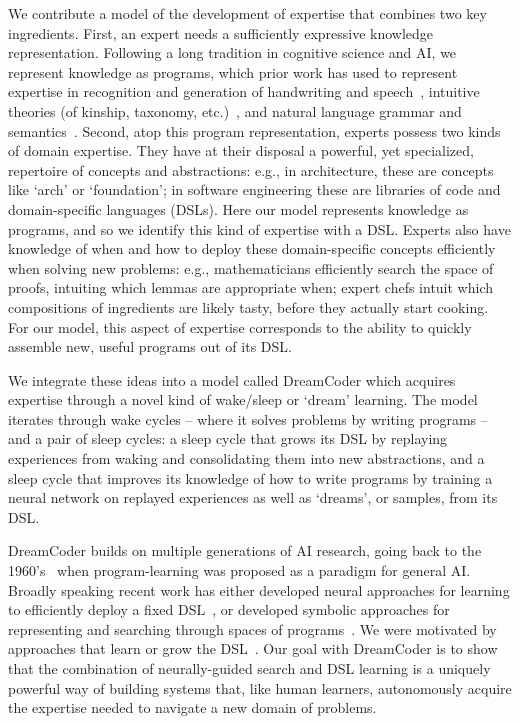 \documentclass{article}
\begin{document}
We contribute a model of the development of expertise that combines
two key ingredients.  First, an expert needs a sufficiently expressive
knowledge representation.  Following a long tradition in cognitive
science and AI, we represent knowledge as programs, which prior work
has used to represent expertise in recognition and generation of
handwriting and speech~\cite{lake2015human}, intuitive theories (of
kinship, taxonomy, etc.)~\cite{Ullman2012}, and natural language
grammar and
semantics~\cite{DBLP:journals/cogsr/SchmidK11,piantadosi2011learning}.
Second, atop this program representation, experts possess two kinds of
domain expertise.  They have at their disposal a powerful, yet
specialized, repertoire of concepts and abstractions: e.g., in
architecture, these are concepts like `arch' or `foundation'; in
software engineering these are libraries of code and domain-specific
languages (DSLs).  Here our model represents knowledge as programs,
and so we identify this kind of expertise with a DSL.  Experts also
have knowledge of when and how to deploy these domain-specific
concepts efficiently when solving new problems: e.g., mathematicians
efficiently search the space of proofs, intuiting which lemmas are
appropriate when; expert chefs intuit which compositions of
ingredients are likely tasty, before they actually start cooking.  For
our model, this aspect of expertise corresponds to the ability to
quickly assemble new, useful programs out of its DSL.

We integrate these ideas into a model called DreamCoder which acquires
expertise through a novel kind of wake/sleep or `dream' learning. The
model iterates through wake cycles -- where it solves problems by
writing programs -- and a pair of sleep cycles: a sleep cycle that
grows its DSL by replaying experiences from waking and consolidating
them into new abstractions, and a sleep cycle that improves its
knowledge of how to write programs by training a neural network on
replayed experiences as well as `dreams', or samples, from its DSL.

DreamCoder builds on multiple generations of AI research, going back
to the 1960's~\cite{solomonoff1964formal} when program-learning was
proposed as a paradigm for general AI.  Broadly speaking recent work
has either developed neural approaches for learning to efficiently
deploy a fixed
DSL~\cite{devlin2017robustfill,balog2016deepcoder,NGDS,spiral}, or
developed symbolic approaches for representing and searching through
spaces of
programs~\cite{gulwani2011automating,solar2008program,DBLP:books/daglib/0070933}.
We were motivated by approaches that learn or grow the
DSL~\cite{Dechter:2013:BLV:2540128.2540316,DBLP:conf/icml/LiangJK10,solomonoff1989system,DBLP:journals/corr/abs-1110-5667,stolle2002learning}.
Our goal with DreamCoder is to show that the combination of
neurally-guided search and DSL learning is a uniquely powerful way of
building systems that, like human learners, autonomously acquire the
expertise needed to navigate a new domain of problems.
\end{document}
